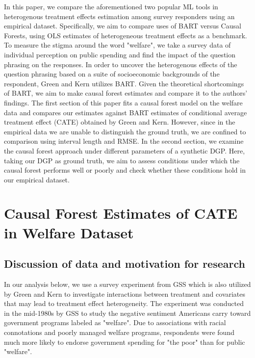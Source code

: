 \documentclass[12pt]{article}
\begin{document}
In this paper, we compare the aforementioned two popular ML tools in
heterogenous treatment effects estimation among survey responders using an
empirical dataset. Specifically, we aim to compare uses of BART versus Causal
Forests, using OLS estimates of heterogeneous treatment effects as a benchmark.
To measure the stigma around the word "welfare", we take a survey data of
individual perception on public spending and find the impact of the question
phrasing on the responses. In order to uncover the heterogenous effects of the
question phrasing based on a suite of socioeconomic backgrounds of the
respondent, Green and Kern utilizes BART. Given the theoretical shortcomings of
BART, we aim to make causal forest estimates and compare it to the authors'
findings. The first section of this paper fits a causal forest model on the welfare data and compares our estimates against BART estimates of conditional average treatment effect (CATE) obtained by Green and Kern. However, since in the empirical data we are unable to distinguish the ground truth, we are confined to comparison using interval length and RMSE. In the second section, we examine the causal forest approach under different parameters of a synthetic DGP. Here, taking our DGP as ground truth, we aim to assess conditions under which the causal forest performs well or poorly and check whether these conditions hold in our empirical dataset. \\ 

\section{Causal Forest Estimates of CATE in Welfare Dataset} 

\subsection{Discussion of data and motivation for research} 
In our analysis below, we use a survey experiment from GSS which is also utilized by Green and Kern to investigate interactions between treatment and covariates that may lead to treatment effect heterogeneity. The experiment was conducted in the mid-1980s by GSS to study the negative sentiment Americans carry toward government programs labeled as "welfare". Due to associations with racial connotations and poorly managed welfare programs, respondents were found much more likely to endorse government spending for "the poor" than for public "welfare".\cite{rasinski1989}\\
\end{document}
